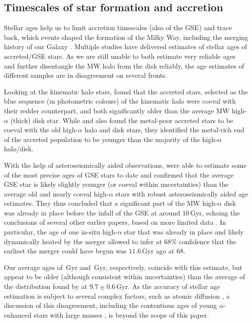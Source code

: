 \documentclass[fleqn,usenatbib]{mnras}
\newcommand{\Gyr}{\,\mathrm{Gyr}}	%
\begin{document}
\subsection{Timescales of star formation and accretion} \label{sec:age_timescale}

Stellar ages help us to limit accretion timescales (also of the GSE) and trace back, which events shaped the formation of the Milky Way, including the merging history of our Galaxy \citep{Wyse2001}. Multiple studies \citep[e.g.][]{Jofre2010, Schuster2012, Hawkins2014, Gallart2019, Das2020, Montalban2021} have delivered estimates of stellar ages of accreted/GSE stars. As we are still unable to both estimate very reliable ages and further disentangle the MW halo from the disk reliably, the age estimates of different samples are in disagreement on several fronts.

Looking at the kinematic halo stars, \citet{Gallart2019} found that the accreted stars, selected as the blue sequence (in photometric colours) of the kinematic halo were coeval with their redder counterpart, and both significantly older than the average MW high-$\alpha$ (thick) disk star. While \citet{Schuster2012} and \citet{Hawkins2014} also found the metal-poor accreted stars to be coeval with the old high-$\alpha$ halo and disk stars, they identified the metal-rich end of the accreted population to be younger than the majority of the high-$\alpha$ halo/disk.

With the help of asteroseismically aided observations, \citet{Montalban2021} were able to estimate some of the most precise ages of GSE stars to date and confirmed that the average GSE star is likely slightly younger (or coeval within uncertainties) than the average old and nearly coeval high-$\alpha$ stars \citep{Miglio2021} with robust asteroseismically aided age estimates. They thus concluded that a significant part of the MW high-$\alpha$ disk was already in place before the infall of the GSE at around $10\Gyr$, echoing the conclusions of several other earlier papers, based on more limited data \citep[e.g.][and references therein]{Wyse2001}. In particular, the age of one in-situ high-$\alpha$ star that was already in place and likely dynamically heated by the merger allowed \citep{Chaplin2020} to infer at 68\% confidence that the earliest the merger could have begun was $11.6\Gyr$ ago at 68.

Our average ages of $\Gyr$ and $\Gyr$, respectively, coincide with this estimate, but appear to be older (although consistent within uncertainties) than the average of the distribution found by \citet{Montalban2021} at $9.7\pm0.6\Gyr$. As the accuracy of stellar age estimation is subject to several complex factors, such as atomic diffusion \citep[see e.g.][]{Jofre2011}, a discussion of this disagreement, including the contentious ages of young $\alpha$-enhanced stars with large masses \citep[e.g.][]{Chiappini2015,Zhang2021}, is beyond the scope of this paper.
\end{document}
